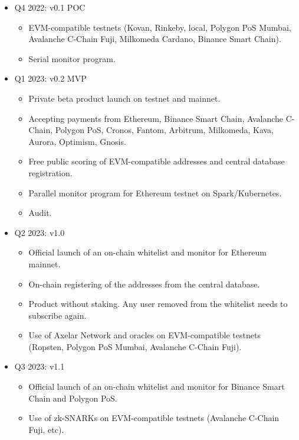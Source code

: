 ﻿\documentclass[a4paper]{article}
\begin{document}
\begin{itemize}
\item
Q4 2022:  v0.1 POC
    \begin{itemize}
    \item EVM-compatible testnets (Kovan, Rinkeby, local, Polygon PoS Mumbai, Avalanche C-Chain Fuji, Milkomeda Cardano, Binance Smart Chain). 
    \item Serial monitor program. 
    \end{itemize}

\item
Q1 2023: v0.2 MVP
    \begin{itemize}
    \item Private beta product launch on testnet and mainnet.
    \item Accepting payments from Ethereum, Binance Smart Chain, Avalanche C-Chain, Polygon PoS, Cronos, Fantom, Arbitrum, Milkomeda, Kava, Aurora, Optimism, Gnosis. 
    \item Free public scoring of EVM-compatible addresses and central database registration.
    \item Parallel monitor program for Ethereum testnet on Spark/Kubernetes.
    \item Audit.
    \end{itemize}

\item
Q2 2023: v1.0
    \begin{itemize}
    \item Official launch of an on-chain whitelist and monitor for Ethereum mainnet.
    \item On-chain registering of the addresses from the central database.
    \item Product without staking. Any user removed from the whitelist needs to subscribe again.
    \item Use of Axelar Network and oracles on EVM-compatible testnets (Ropsten, Polygon PoS Mumbai, Avalanche C-Chain Fuji).
    \end{itemize}

\item
Q3 2023: v1.1
    \begin{itemize}
    \item Official launch of an on-chain whitelist and monitor for Binance Smart Chain and Polygon PoS.
    \item Use of zk-SNARKs on EVM-compatible testnets (Avalanche C-Chain Fuji, etc). 
    \end{itemize}


\end{itemize}
\end{document}
